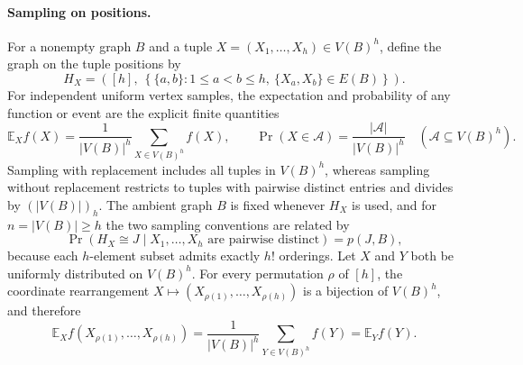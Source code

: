 \documentclass[11pt]{article}
\newcommand{\E}{\mathbb E}
\begin{document}
\paragraph{Sampling on positions.}
For a nonempty graph $B$ and a tuple $X=(X_1,\ldots,X_h)\in V(B)^h$, define the graph on the tuple positions by
\begin{equation}\label{eq:position-graph}
H_X=\left([h],\ 
\left\{\{a,b\}:1\leq a<b\leq h,\ \{X_a,X_b\}\in E(B)\right\}\right).
\end{equation}
For independent uniform vertex samples, the expectation and probability of any function or event are the explicit finite quantities
\[
\E_X f(X)=\frac1{|V(B)|^h}\sum_{X\in V(B)^h}f(X),
\qquad
\Pr(X\in\mathcal A)=\frac{|\mathcal A|}{|V(B)|^h}
\quad(\mathcal A\subseteq V(B)^h).
\]
Sampling with replacement includes all tuples in $V(B)^h$, whereas sampling without replacement restricts to tuples with pairwise distinct entries and divides by $(|V(B)|)_h$.
The ambient graph $B$ is fixed whenever $H_X$ is used, and for $n=|V(B)|\geq h$ the two sampling conventions are related by
\[
\Pr(H_X\cong J\mid X_1,\ldots,X_h\text{ are pairwise distinct})=p(J,B),
\]
because each $h$-element subset admits exactly $h!$ orderings.
Let $X$ and $Y$ both be uniformly distributed on $V(B)^h$.
For every permutation $\rho$ of $[h]$, the coordinate rearrangement $X\mapsto(X_{\rho(1)},\ldots,X_{\rho(h)})$ is a bijection of $V(B)^h$, and therefore
\begin{equation}\label{eq:exchangeability}
\E_X f(X_{\rho(1)},\ldots,X_{\rho(h)})
=\frac1{|V(B)|^h}\sum_{Y\in V(B)^h}f(Y)=\E_Yf(Y).
\end{equation}
\end{document}
